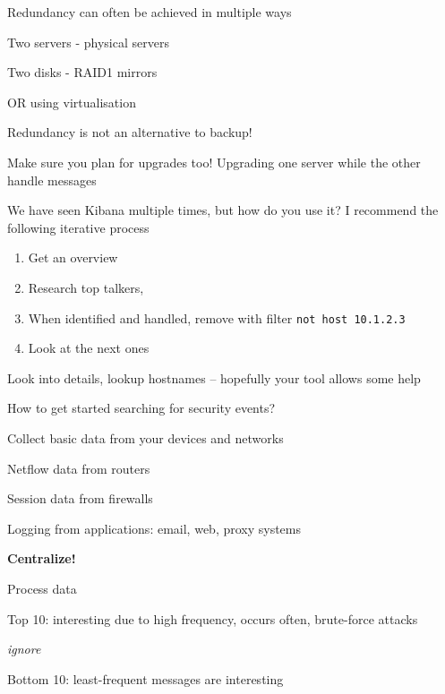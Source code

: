 \documentclass[Screen16to9,17pt]{foils}
\begin{document}

\begin{quote}

\end{quote}

\begin{list2}
\item Redundancy can often be achieved in multiple ways
\item Two servers - physical servers
\item Two disks - RAID1 mirrors
\item OR using virtualisation
\item Redundancy is not an alternative to backup!
\item Make sure you plan for upgrades too! Upgrading one server while the other handle messages
\end{list2}





\begin{quote}

\end{quote}

We have seen Kibana multiple times, but how do you use it? I recommend the following iterative process
\begin{enumerate}
\item Get an overview
\item Research top talkers,
\item When identified and handled, remove with filter \verb+not host 10.1.2.3+
\item Look at the next ones
\end{enumerate}

Look into details, lookup hostnames -- hopefully your tool allows some help





\begin{list1}
\item How to get started searching for security events?
\item Collect basic data from your devices and networks
\begin{list2}
\item Netflow data from routers
\item Session data from firewalls
\item Logging from applications: email, web, proxy systems
\end{list2}
\item {\bf Centralize!}
\item Process data
\begin{list2}
\item Top 10: interesting due to high frequency, occurs often, brute-force attacks
\item {\it ignore}
\item Bottom 10: least-frequent messages are interesting
\end{list2}
\end{list1}
\end{document}

